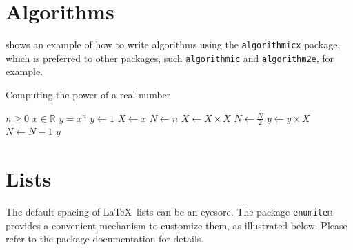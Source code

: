\section{Algorithms}

 shows an example of how to write algorithms using the \texttt{algorithmicx} package, which is preferred to other packages, such \texttt{algorithmic} and \texttt{algorithm2e}, for example.

\begin{algorithm}[hbt] %
  \caption{Computing the power of a real number}
  \label{alg:power}
  \begin{algorithmic}[1] %
    \Require
    \Statex $n \geq 0$ 
    \Statex $x \in \mathbb{R}$
    \Ensure
    \Statex $y = x^n$
    \Statex %
    \State $y \gets 1$
    \State $X \gets x$
    \State $N \gets n$
      
    \State $X \gets X \times X$
    \State $N \gets \frac{N}{2} $  
    \State $y \gets y \times X$
    \State $N \gets N - 1$
    \EndIf
    \EndWhile
    \State \Return $y$
  \end{algorithmic}
\end{algorithm}



\section{Lists}
The default spacing of \LaTeX\ lists can be an eyesore. The package \texttt{enumitem} provides a convenient mechanism to customize them, as illustrated below. Please refer to the package documentation for details.

